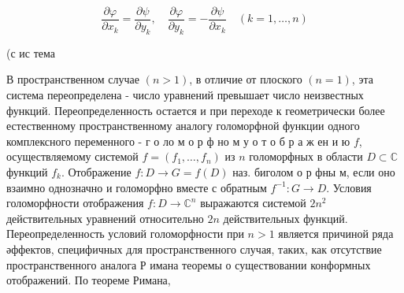 \documentclass[10pt]{article}
\begin{document}
\[

\frac{\partial \varphi}{\partial x_{k}}=\frac{\partial \psi}{\partial y_{k}}, \quad \frac{\partial \varphi}{\partial y_{k}}=-\frac{\partial \psi}{\partial x_{k}} \quad(k=1, \ldots, n)

\]



(с ис тема



В пространственном случае $(n>1)$, в отличие от плоского $(n=1)$, эта система переопределена - число уравнений превышает число неизвестных функций. Переопределенность остается и при переходе к геометрически более естественному пространственному аналогу голоморфной функции одного комплексного переменного - г о ло м о р ф но м у о т о б р а ж ен и ю $f$, осуществляемому системой $f=\left(f_{1}, \ldots, f_{n}\right)$ из $n$ голоморфных в области $D \subset \mathbb{C}$ функций $f_{k}$. Отображение $f: D \rightarrow G=f(D)$ наз. биголом о р фны м, если оно взаимно однозначно и голоморфно вместе с обратным $f^{-1}: G \rightarrow D$. Условия голоморфности отображения $f: D \rightarrow \mathbb{C}^{n}$ выражаются системой $2 n^{2}$ действительных уравнений относительно $2 n$ действительных функций. Переопределенность условий голоморфности при $n>1$ является причиной ряда әффектов, специфичных для пространственного случая, таких, как отсутствие пространственного аналога Р имана теоремы о существовании конформных отображений. По теореме Римана,
\end{document}
